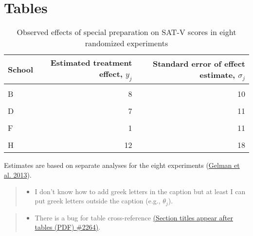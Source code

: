 \documentclass[
  12pt,
  letterpaper,
  DIV=11,
  numbers=noendperiod]{scrartcl}
\providecommand{\tightlist}{%
  \setlength{\itemsep}{0pt}\setlength{\parskip}{0pt}}\usepackage{longtable,booktabs,array}
\begin{document}
\newpage

\hypertarget{tables-1}{%
\section{Tables}\label{tables-1}}

\begin{table}

\end{table}

\hypertarget{tbl-eight_schools}{}
\begin{table}[h!]
\caption{\label{tbl-eight_schools}Observed effects of special preparation on SAT-V scores in eight
randomized experiments }\tabularnewline


\begin{tabular}[t]{lrr}
\toprule
School & Estimated treatment effect, $y_j$ & Standard error of effect estimate, $\sigma_j$\\
\midrule
\cellcolor{gray!6}{A} & \cellcolor{gray!6}{28} & \cellcolor{gray!6}{15}\\
B & 8 & 10\\
\cellcolor{gray!6}{C} & \cellcolor{gray!6}{-3} & \cellcolor{gray!6}{16}\\
D & 7 & 11\\
\cellcolor{gray!6}{E} & \cellcolor{gray!6}{-1} & \cellcolor{gray!6}{9}\\
\addlinespace
F & 1 & 11\\
\cellcolor{gray!6}{G} & \cellcolor{gray!6}{18} & \cellcolor{gray!6}{10}\\
H & 12 & 18\\
\bottomrule
\end{tabular}
\end{table}

Estimates are based on separate analyses for the eight experiments
(\protect\hyperlink{ref-Gelman2013}{Gelman et al. 2013}).

\begin{quote}
\begin{itemize}
\tightlist
\item
  I don't know how to add greek letters in the caption but at least I
  can put greek letters outside the caption (e.g., \(\theta_j\)).
\end{itemize}
\end{quote}

\begin{quote}
\begin{itemize}
\tightlist
\item
  There is a bug for table cross-reference
  \href{https://github.com/quarto-dev/quarto-cli/discussions/2264\#discussioncomment-3541972}{(Section
  titles appear after tables (PDF) \#2264)}.
\end{itemize}
\end{quote}
\end{document}
